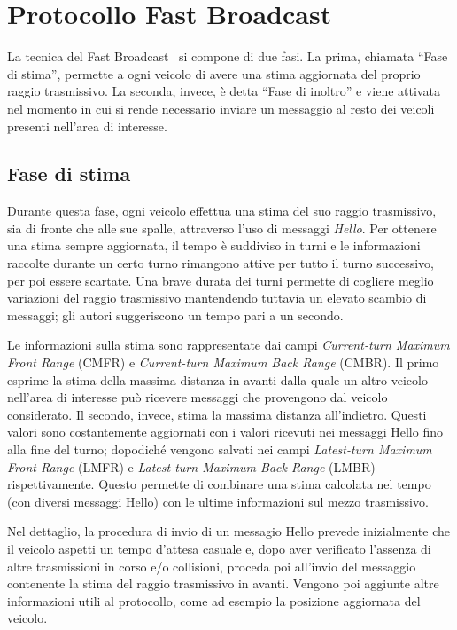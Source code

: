 
\chapter{Protocollo Fast Broadcast}\label{chap:protocollo-fast-broadcast}
La tecnica del Fast Broadcast~\cite{Palazzi07howdo} si compone di due fasi. La prima, chiamata ``Fase di stima'', permette a ogni veicolo di avere una stima aggiornata
del proprio raggio trasmissivo.
La seconda, invece, è detta ``Fase di inoltro'' e viene attivata nel momento in cui si rende necessario inviare un messaggio
al resto dei veicoli presenti nell'area di interesse.
%
\section{Fase di stima}\label{sec:fb-fase-di-stima}
Durante questa fase, ogni veicolo effettua una stima del suo raggio trasmissivo, sia di fronte che alle sue spalle, attraverso l'uso di messaggi \textit{Hello}.
Per ottenere una stima sempre aggiornata, il tempo è suddiviso in turni e le informazioni raccolte durante un certo turno
rimangono attive per tutto il turno successivo, per poi essere scartate.
Una brave durata dei turni permette di cogliere meglio variazioni del raggio trasmissivo mantendendo tuttavia un elevato scambio di messaggi;
gli autori suggeriscono un tempo pari a un secondo.

Le informazioni sulla stima sono rappresentate dai campi \textit{Current-turn Maximum Front Range} (CMFR) e \textit{Current-turn Maximum Back Range} (CMBR).
Il primo esprime la stima della massima distanza in avanti dalla quale un altro veicolo nell'area di interesse può ricevere messaggi che provengono dal veicolo considerato.
Il secondo, invece, stima la massima distanza all'indietro.
Questi valori sono costantemente aggiornati con i valori ricevuti nei messaggi Hello fino alla fine del turno;
dopodiché vengono salvati nei campi \textit{Latest-turn Maximum Front Range} (LMFR) e \textit{Latest-turn Maximum Back Range} (LMBR) rispettivamente.
Questo permette di combinare una stima calcolata nel tempo (con diversi messaggi Hello) con le ultime informazioni sul mezzo trasmissivo.

Nel dettaglio, la procedura di invio di un messagio Hello prevede inizialmente che il veicolo aspetti un tempo d'attesa casuale e,
dopo aver verificato l'assenza di altre trasmissioni in corso e/o collisioni, proceda poi all'invio del messaggio contenente
la stima del raggio trasmissivo in avanti.
Vengono poi aggiunte altre informazioni utili al protocollo, come ad esempio la posizione aggiornata del veicolo.

